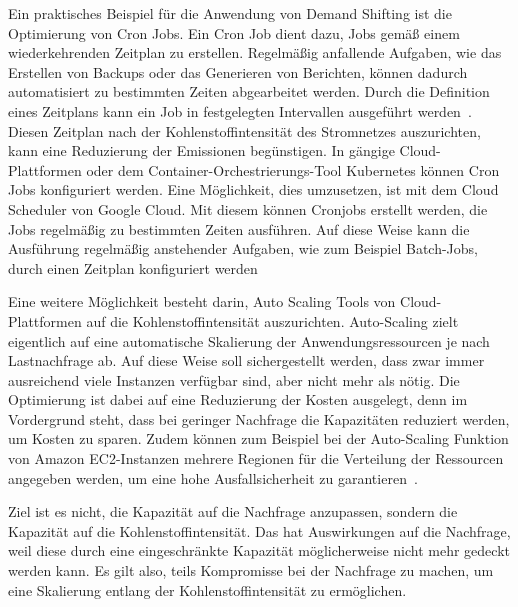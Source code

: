 Ein praktisches Beispiel für die Anwendung von Demand Shifting ist die Optimierung von Cron Jobs.
Ein Cron Job dient dazu, Jobs gemäß einem wiederkehrenden Zeitplan zu erstellen.
Regelmäßig anfallende Aufgaben, wie das Erstellen von Backups oder das Generieren von Berichten, können dadurch automatisiert zu bestimmten Zeiten abgearbeitet werden.
Durch die Definition eines Zeitplans kann ein Job in festgelegten Intervallen ausgeführt werden~\cite{TheKubernetesAuthors.20240119T14:53:20+01:00}.
Diesen Zeitplan nach der Kohlenstoffintensität des Stromnetzes auszurichten, kann eine Reduzierung der Emissionen begünstigen.
In gängige Cloud-Plattformen oder dem Container-Orchestrierungs-Tool Kubernetes können Cron Jobs konfiguriert werden.
Eine Möglichkeit, dies umzusetzen, ist mit dem Cloud Scheduler von Google Cloud.
Mit diesem können Cronjobs erstellt werden, die Jobs regelmäßig zu bestimmten Zeiten ausführen.
Auf diese Weise kann die Ausführung regelmäßig anstehender Aufgaben, wie zum Beispiel Batch-Jobs, durch einen Zeitplan konfiguriert werden

Eine weitere Möglichkeit besteht darin, Auto Scaling Tools von Cloud-Plattformen auf die Kohlenstoffintensität auszurichten.
Auto-Scaling zielt eigentlich auf eine automatische Skalierung der Anwendungsressourcen je nach Lastnachfrage ab.
Auf diese Weise soll sichergestellt werden, dass zwar immer ausreichend viele Instanzen verfügbar sind, aber nicht mehr als nötig.
Die Optimierung ist dabei auf eine Reduzierung der Kosten ausgelegt, denn im Vordergrund steht, dass bei geringer Nachfrage die Kapazitäten reduziert werden, um Kosten zu sparen.
Zudem können zum Beispiel bei der Auto-Scaling Funktion von Amazon EC2-Instanzen mehrere Regionen für die Verteilung der Ressourcen angegeben werden, um eine hohe Ausfallsicherheit zu garantieren~\cite{AmazonWebServices.20240229}.

Ziel ist es nicht, die Kapazität auf die Nachfrage anzupassen, sondern die Kapazität auf die Kohlenstoffintensität.
Das hat Auswirkungen auf die Nachfrage, weil diese durch eine eingeschränkte Kapazität möglicherweise nicht mehr gedeckt werden kann.
Es gilt also, teils Kompromisse bei der Nachfrage zu machen, um eine Skalierung entlang der Kohlenstoffintensität zu ermöglichen.

